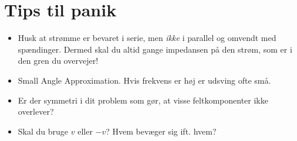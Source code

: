 \documentclass[a4paper]{article}
\begin{document}
    \newpage
    \section{Tips til panik}
    \begin{itemize}
        \item Husk at strømme er bevaret i serie, men \textit{ikke} i parallel og omvendt med spændinger. Dermed skal du altid gange impedansen på den strøm, som er i den gren du overvejer!
        \item Small Angle Approximation. Hvis frekvens er høj er udsving ofte små.
        \item Er der symmetri i dit problem som gør, at visse feltkomponenter ikke overlever?
        \item Skal du bruge \(v\) eller \(-v\)? Hvem bevæger sig ift. hvem?
    \end{itemize}
\end{document}
